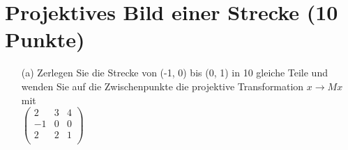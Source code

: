\documentclass[11pt]{article}
\begin{document}
\section{Projektives Bild einer Strecke (10 Punkte)}
\begin{enumerate}
\item[(a)] Zerlegen Sie die Strecke von (-1, 0) bis (0, 1) in 10 gleiche Teile und wenden Sie auf die Zwischenpunkte die projektive Transformation $x \rightarrow M x$ mit\\
$
\begin{pmatrix}
2 & 3 &  4 \\
-1 & 0 & 0 \\
2 & 2 & 1 \\
\end{pmatrix}
$\\



\end{enumerate}
\end{document}

